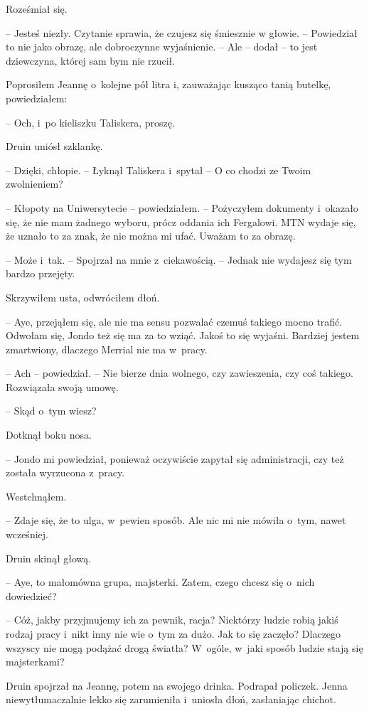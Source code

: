 \documentclass[oneside,polish,11pt,sfheadings]{mwbk}
\begin{document}
Roześmiał się. 

-- Jesteś niezły. Czytanie sprawia, że czujesz się śmiesznie
w głowie. -- Powiedział to nie jako obrazę, ale dobroczynne wyjaśnienie.
-- Ale -- dodał -- to jest dziewczyna, której sam bym nie rzucił.

Poprosiłem Jeannę o~kolejne pół litra i, zauważając kusząco tanią
butelkę, powiedziałem: 

-- Och, i~po kieliszku Taliskera, proszę.

Druin uniósł szklankę. 

-- Dzięki, chłopie. -- Łyknął Taliskera i~spytał -- O co chodzi ze Twoim zwolnieniem?

-- Kłopoty na Uniwersytecie -- powiedziałem. -- Pożyczyłem dokumenty i~okazało się, że nie mam żadnego wyboru, prócz oddania ich Fergalowi. MTN
wydaje się, że uznało to za znak, że nie można mi ufać. Uważam to za
obrazę.

-- Może i~tak. -- Spojrzał na mnie z~ciekawością. -- Jednak nie wydajesz
się tym bardzo przejęty.

Skrzywiłem usta, odwróciłem dłoń. 

-- Aye, przejąłem się, ale nie ma sensu
pozwalać czemuś takiego mocno trafić. Odwołam się, Jondo też się ma za
to wziąć. Jakoś to się wyjaśni. Bardziej jestem zmartwiony, dlaczego
Merrial nie ma w~pracy.

-- Ach -- powiedział. -- Nie bierze dnia wolnego, czy zawieszenia, czy coś
takiego. Rozwiązała swoją umowę.

-- Skąd o~tym wiesz?

Dotknął boku nosa. 

-- Jondo mi powiedział, ponieważ oczywiście zapytał
się administracji, czy też została wyrzucona z~pracy.

Westchnąłem. 

-- Zdaje się, że to ulga, w~pewien sposób. Ale nic mi nie
mówiła o~tym, nawet wcześniej.

Druin skinął głową. 

-- Aye, to małomówna grupa, majsterki. Zatem, czego
chcesz się o~nich dowiedzieć?

-- Cóż, jakby przyjmujemy ich za pewnik, racja? Niektórzy ludzie robią
jakiś rodzaj pracy i~nikt inny nie wie o~tym za dużo. Jak to się
zaczęło? Dlaczego wszyscy nie mogą podążać drogą światła? W~ogóle, w~jaki sposób ludzie stają się majsterkami?

Druin spojrzał na Jeannę, potem na swojego drinka. Podrapał policzek.
Jenna niewytłumaczalnie lekko się zarumieniła i~uniosła dłoń,
zasłaniając chichot.
\end{document}
